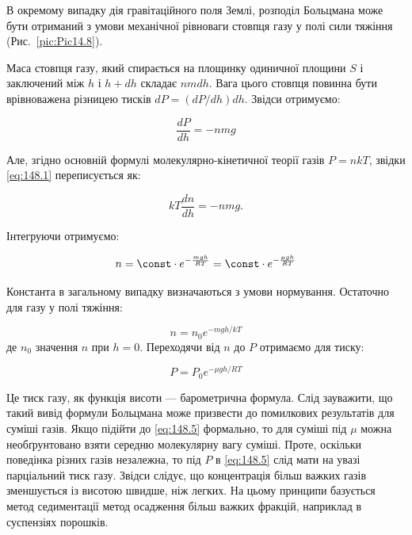 В окремому випадку дія гравітаційного поля Землі, розподіл Больцмана може бути отриманий з умови механічної рівноваги стовпця газу у полі сили тяжіння (Рис.~\ref{pic:Pic14.8}).

Маса стовпця газу, який спирається на площинку одиничної площини $S$ і заключений між $h$ і $h + dh$ складає $n m dh$. Вага цього стовпця повинна бути врівноважена різницею тисків $dP = (dP / dh) dh$. Звідси отримуємо:

\begin{equation}
	\frac{dP}{dh} = - n m g
	\label{eq:148.1}
\end{equation}

Але, згідно основній формулі молекулярно-кінетичної теорії газів $P = n k T$, звідки \eqref{eq:148.1} переписується як:

\begin{equation}
	kT\frac{dn}{dh}=-nmg.
	\label{eq:148.2}
\end{equation}

Інтегруючи отримуємо:

\begin{equation}
	n=\const\cdot e^{-\frac{mgh}{RT}}=\const\cdot e^{-\frac{\mu gh}{RT}}
	\label{eq:148.3}
\end{equation}

Константа в загальному випадку визначаються з умови нормування. Остаточно для газу у полі тяжіння:

\begin{equation}
	n = n_0 e^{-m g h / k T}
	\label{eq:148.4}
\end{equation}
%
де $n_0$ значення $n$ при $h = 0$. Переходячи від $n$ до $P$ отримаємо для тиску:

\begin{equation}
	P = P_0 e^{-\mu g h / R T}
	\label{eq:148.5}
\end{equation}

Це тиск газу, як функція висоти --- барометрична формула. Слід зауважити, що такий вивід формули Больцмана може призвести до помилкових результатів для суміші газів. Якщо підійти до \eqref{eq:148.5} формально, то для суміші під $\mu$ можна необґрунтовано взяти середню молекулярну вагу суміші. Проте, оскільки поведінка різних газів незалежна, то під $P$ в \eqref{eq:148.5} слід мати на увазі парціальний тиск газу. Звідси слідує, що концентрація більш важких газів зменшується із висотою швидше, ніж легких. На цьому принципи базується метод седиментації метод осадження більш важких фракцій, наприклад в суспензіях порошків.

